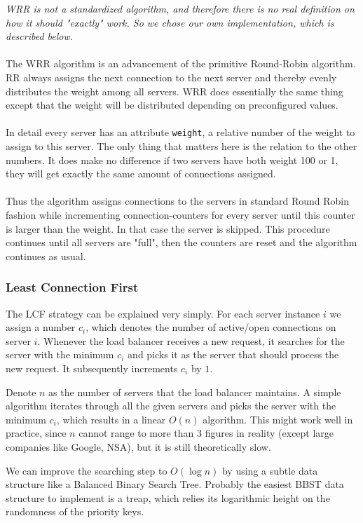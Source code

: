 \documentclass[11pt, a4paper]{article}
\begin{document}
\textit{WRR is not a standardized algorithm, and therefore there is no real definition on how it should "exactly" work. So we chose our own implementation, which is described below.}
\\\\
The WRR algorithm is an advancement of the primitive Round-Robin algorithm. RR always assigns the next connection to the next server and thereby evenly distributes the weight among all servers. WRR does essentially the same thing except that the weight will be distributed depending on preconfigured values.
\\\\
In detail every server has an attribute \lstinline|weight|, a relative number of the weight to assign to this server. The only thing that matters here is the relation to the other numbers. It does make no difference if two servers have both weight 100 or 1, they will get exactly the same amount of connections assigned.
\\\\
Thus the algorithm assigns connections to the servers in standard Round Robin fashion while incrementing connection-counters for every server until this counter is larger than the weight. In that case the server is skipped. This procedure continues until all servers are "full", then the counters are reset and the algorithm continues as usual.

\subsubsection{Least Connection First}

The LCF strategy can be explained very simply. For each server
instance $i$ we assign a number $c_i$, which denotes the number of
active/open connections on server $i$. Whenever the load balancer
receives a new request, it searches for the server with the minimum
$c_i$ and picks it as the server that should process the new
request. It subsequently increments $c_i$ by $1$. 

Denote $n$ as the number of servers that the load balancer
maintains. A simple algorithm iterates through all the given servers
and picks the server with the minimum $c_i$, which results in a linear
$O(n)$ algorithm. This might work well in practice, since $n$ cannot
range to more than 3 figures in reality (except large companies like
Google, NSA), but it is still theoretically slow. 

We can improve the searching step to $O(\log n)$ by using a subtle
data structure like a Balanced Binary Search Tree. Probably the
easiest BBST data structure to implement is a treap, which relies its
logarithmic height on the randomness of the priority keys.
\end{document}
